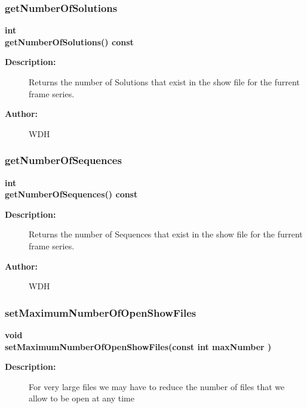 \subsubsection{getNumberOfSolutions}
 
\begin{flushleft} \textbf{%
int  \\ 
\settowidth{\ShowFileReaderIncludeArgIndent}{getNumberOfSolutions(}%
getNumberOfSolutions() const
}\end{flushleft}
\begin{description}
\item[{\bf Description:}] 
    Returns the number of Solutions that exist in the show file for the furrent frame series. 
\item[{\bf Author:}]  WDH
\end{description}
\subsubsection{getNumberOfSequences}
 
\begin{flushleft} \textbf{%
int  \\ 
\settowidth{\ShowFileReaderIncludeArgIndent}{getNumberOfSequences(}%
getNumberOfSequences() const
}\end{flushleft}
\begin{description}
\item[{\bf Description:}] 
    Returns the number of Sequences that exist in the show file for the furrent frame series. 
\item[{\bf Author:}]  WDH
\end{description}
\subsubsection{setMaximumNumberOfOpenShowFiles}
 
\begin{flushleft} \textbf{%
void  \\ 
\settowidth{\ShowFileReaderIncludeArgIndent}{setMaximumNumberOfOpenShowFiles(}%
setMaximumNumberOfOpenShowFiles(const int maxNumber )
}\end{flushleft}
\begin{description}
\item[{\bf Description:}] 
 For very large files we may have to reduce the number of files that we allow to be open at any time
 
\end{description}
